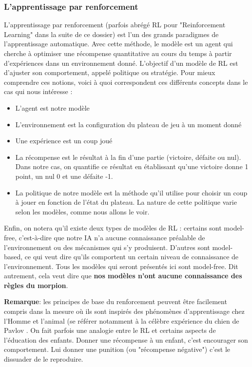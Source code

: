 \documentclass[french]{article}
\begin{document}
    \subsubsection{L'apprentissage par renforcement}
    L'apprentissage par renforcement \cite{RL survey}(parfois abrégé RL pour "Reinforcement Learning" dans la suite de ce dossier) est l'un des grands paradigmes de l'apprentissage automatique. Avec cette méthode, le modèle est un agent qui cherche à optimiser une récompense quantitative au cours du temps à partir d'expériences dans un environnement donné. L'objectif d'un modèle de RL est d'ajuster son comportement, appelé politique ou stratégie. Pour mieux comprendre ces notions, voici à quoi correspondent ces différents concepts dans le cas qui nous intéresse :
    \begin{itemize}
        \item L'agent est notre modèle
        \item L'environnement est la configuration du plateau de jeu à un moment donné
        \item Une expérience est un coup joué 
        \item La récompense est le résultat à la fin d'une partie (victoire, défaite ou nul). Dans notre cas, on quantifie ce résultat en établissant qu'une victoire donne 1 point, un nul 0 et une défaite -1.
        \item La politique de notre modèle est la méthode qu'il utilise pour choisir un coup à jouer en fonction de l'état du plateau. La nature de cette politique varie selon les modèles, comme nous allons le voir.
    \end{itemize}

    Enfin, on notera qu'il existe deux types de modèles de RL : certains sont model-free, c'est-à-dire que notre IA n'a aucune connaissance préalable de l'environnement ou des mécanismes qui s'y produisent. D'autres sont model-based, ce qui veut dire qu'ils comportent un certain niveau de connaissance de l'environnement. Tous les modèles qui seront présentés ici sont model-free. Dit autrement, cela veut dire que \textbf{nos modèles n'ont aucune connaissance des règles du morpion}.
    
    \textbf{Remarque}: les principes de base du renforcement peuvent être facilement compris dans la mesure où ils sont inspirés des phénomènes d'apprentissage chez l'Homme et l'animal (se référer notamment à la célèbre expérience du chien de Pavlov \cite{pavlov}. On fait parfois une analogie entre le RL et certains aspects de l'éducation des enfants. Donner une récompense à un enfant, c'est encourager son comportement. Lui donner une punition (ou "récompense négative") c'est le dissuader de le reproduire.
\end{document}
